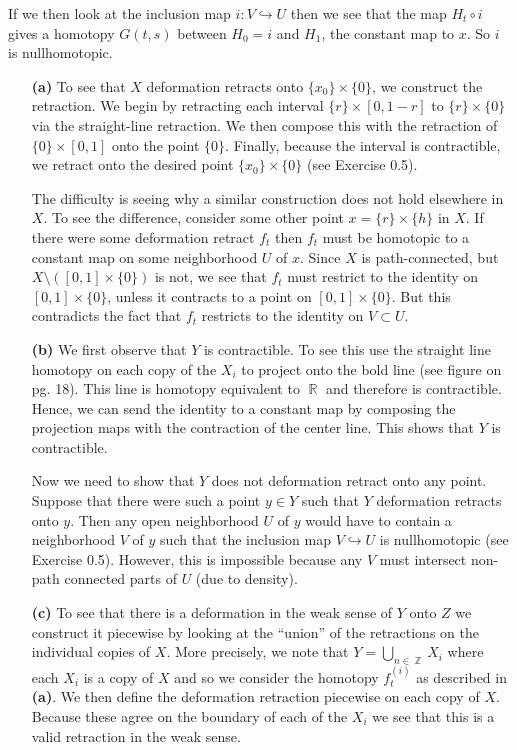 \documentclass{article}
\DeclareMathOperator{\Z}{\mathbb{Z}}
\DeclareMathOperator{\R}{\mathbb{R}}
\DeclareMathOperator{\into}{\hookrightarrow}
\newcommand{\exercise}[1]{\noindent{\textbf{Exercise #1:}}}
\begin{document}
If we then look at the inclusion map $i: V \into U$ then we see that
the map $H_t \circ i$ gives a homotopy $G(t,s)$ between $H_0 = i$ and
$H_1$, the constant map to $x$. So $i$ is nullhomotopic.

\exercise{0.6}
\begin{enumerate}
\item[\textbf{(a)}] To see that $X$ deformation retracts onto $\{x_0\}
  \times \{0\}$, we construct the retraction. We begin by retracting
  each interval $\{r\} \times [0,1-r]$ to $\{r\} \times \{0\}$ via the
  straight-line retraction. We then compose this with the retraction
  of $\{0\} \times [0,1]$ onto the point $\{0\}$. Finally, because the
  interval is contractible, we retract onto the desired point $\{x_0\}
  \times \{0\}$ (see Exercise 0.5).

  The difficulty is seeing why a similar construction does not hold
  elsewhere in $X$. To see the difference, consider some other point
  $x = \{r\} \times \{h\}$ in $X$. If there were some deformation
  retract $f_t$ then $f_t$ must be homotopic to a constant map on some
  neighborhood $U$ of $x$. Since $X$ is path-connected, but
  $X\setminus ([0,1] \times \{0\})$ is not, we see that $f_t$ must
  restrict to the identity on $[0,1] \times \{0\}$, unless it
  contracts to a point on $[0,1] \times \{0\}$. But this contradicts
  the fact that $f_t$ restricts to the identity on $V \subset U$.
\item[\textbf{(b)}] We first observe that $Y$ is contractible. To see
  this use the straight line homotopy on each copy of the $X_i$ to
  project onto the bold line (see figure on pg. 18). This line is
  homotopy equivalent to $\R$ and therefore is contractible. Hence, we
  can send the identity to a constant map by composing the projection
  maps with the contraction of the center line. This shows that $Y$
  is contractible.

  Now we need to show that $Y$ does not deformation retract onto any
point. Suppose that there were such a point $y \in Y$ such that $Y$
deformation retracts onto $y$. Then any open neighborhood $U$ of $y$
would have to contain a neighborhood $V$ of $y$ such that the
inclusion map $V \into U$ is nullhomotopic (see Exercise
0.5). However, this is impossible because any $V$ must intersect
non-path connected parts of $U$ (due to density).
\item[\textbf{(c)}] To see that there is a deformation in the weak
sense of $Y$ onto $Z$ we construct it piecewise by looking at the
``union'' of the retractions on the individual copies of $X$. More
precisely, we note that $Y = \bigcup_{n\in \Z} X_i$ where each $X_i$
is a copy of $X$ and so we consider the homotopy $f_t^{(i)}$ as
described in \textbf{(a)}. We then define the deformation retraction
piecewise on each copy of $X$. Because these agree on the boundary of
each of the $X_i$ we see that this is a valid retraction in the weak
sense.


\end{enumerate}
\end{document}
